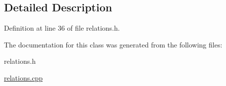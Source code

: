 \subsection{Detailed Description}


Definition at line 36 of file relations.\+h.



The documentation for this class was generated from the following files\+:\begin{DoxyCompactItemize}
\item 
relations.\+h\item 
\hyperlink{relations_8cpp}{relations.\+cpp}\end{DoxyCompactItemize}
